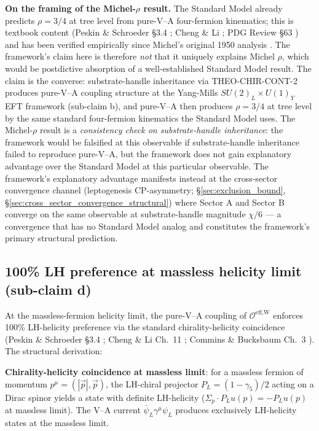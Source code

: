 \documentclass[11pt,letterpaper]{article}
\newcommand{\OeffW}{\mathcal{O}^{\text{eff,W}}}
\begin{document}
\textbf{On the framing of the Michel-$\rho$ result.} The Standard Model already predicts $\rho = 3/4$ at tree level from pure-V--A four-fermion kinematics; this is textbook content (Peskin \& Schroeder §3.4 \cite{Peskin}; Cheng \& Li \cite{ChengLi}; PDG Review §63 \cite{PDG2024}) and has been verified empirically since Michel's original 1950 analysis \cite{Michel1950}. The framework's claim here is therefore \emph{not} that it uniquely explains Michel $\rho$, which would be postdictive absorption of a well-established Standard Model result. The claim is the converse: substrate-handle inheritance via THEO-CHIR-CONT-2 produces pure-V--A coupling structure at the Yang-Mills $SU(2)_L \times U(1)_Y$ EFT framework (sub-claim b), and pure-V--A then produces $\rho = 3/4$ at tree level by the same standard four-fermion kinematics the Standard Model uses. The Michel-$\rho$ result is a \emph{consistency check on substrate-handle inheritance}: the framework would be falsified at this observable if substrate-handle inheritance failed to reproduce pure-V--A, but the framework does not gain explanatory advantage over the Standard Model at this particular observable. The framework's explanatory advantage manifests instead at the cross-sector convergence channel (leptogenesis CP-asymmetry; §\ref{sec:exclusion_bound}, §\ref{sec:cross_sector_convergence_structural}) where Sector A and Sector B converge on the same observable at substrate-handle magnitude $\chi/6$ — a convergence that has no Standard Model analog and constitutes the framework's primary structural prediction.

\subsection{100\% LH preference at massless helicity limit (sub-claim d)}
\label{sec:massless_helicity}

At the massless-fermion helicity limit, the pure-V--A coupling of $\OeffW$ enforces 100\% LH-helicity preference via the standard chirality-helicity coincidence (Peskin \& Schroeder §3.4 \cite{Peskin}; Cheng \& Li Ch.~11 \cite{ChengLi}; Commins \& Bucksbaum Ch.~3 \cite{CommonsBucksbaum}). The structural derivation:

\textbf{Chirality-helicity coincidence at massless limit}: for a massless fermion of momentum $p^\mu = (|\vec{p}|, \vec{p})$, the LH-chiral projector $P_L = (1-\gamma_5)/2$ acting on a Dirac spinor yields a state with definite LH-helicity ($\Sigma_p \cdot P_L u(p) = -P_L u(p)$ at massless limit). The V--A current $\bar{\psi}_L \gamma^\mu \psi_L$ produces exclusively LH-helicity states at the massless limit.
\end{document}
